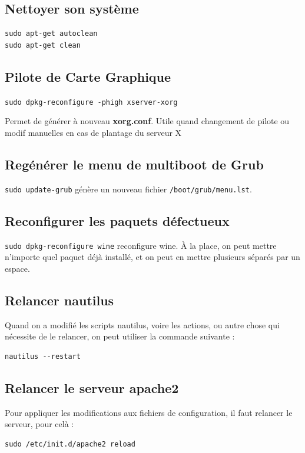 \documentclass[a4paper,twoside]{article}
\begin{document}
\subsection{Nettoyer son système}

\begin{verbatim}
sudo apt-get autoclean
sudo apt-get clean
\end{verbatim}


\subsection{Pilote de Carte Graphique}
\verb|sudo dpkg-reconfigure -phigh xserver-xorg|

Permet de générer à nouveau \textbf{xorg.conf}. Utile quand changement de pilote ou modif manuelles en cas de plantage du serveur X

\subsection{Regénérer le menu de multiboot de Grub}
\verb|sudo update-grub| génère un nouveau fichier \verb|/boot/grub/menu.lst|.

\subsection{Reconfigurer les paquets défectueux}
\verb|sudo dpkg-reconfigure wine| reconfigure wine. \`A la place, on peut mettre n'importe quel paquet déjà installé, et on peut en mettre plusieurs séparés par un espace.

\subsection{Relancer nautilus}
Quand on a modifié les scripts nautilus, voire les actions, ou autre chose qui nécessite de le relancer, on peut utiliser la commande suivante :
\begin{verbatim}
nautilus --restart
\end{verbatim}

\subsection{Relancer le serveur apache2}
Pour appliquer les modifications aux fichiers de configuration, il faut relancer le serveur, pour celà :
\begin{verbatim}
sudo /etc/init.d/apache2 reload
\end{verbatim}
\end{document}
